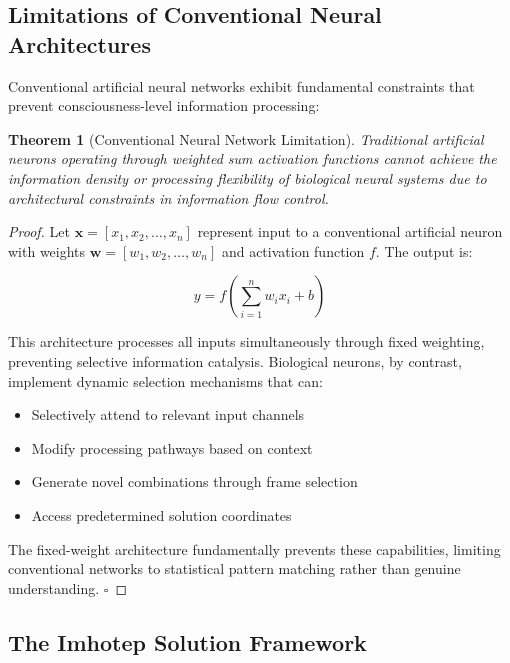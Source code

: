 \documentclass[12pt,a4paper]{article}
\newtheorem{theorem}{Theorem}[section]
\theoremstyle{remark}
\begin{document}
\subsection{Limitations of Conventional Neural Architectures}

Conventional artificial neural networks exhibit fundamental constraints that prevent consciousness-level information processing:

\begin{theorem}[Conventional Neural Network Limitation]
Traditional artificial neurons operating through weighted sum activation functions cannot achieve the information density or processing flexibility of biological neural systems due to architectural constraints in information flow control.
\end{theorem}

\begin{proof}
Let $\mathbf{x} = [x_1, x_2, \ldots, x_n]$ represent input to a conventional artificial neuron with weights $\mathbf{w} = [w_1, w_2, \ldots, w_n]$ and activation function $f$. The output is:

\begin{equation}
y = f\left(\sum_{i=1}^{n} w_i x_i + b\right)
\end{equation}

This architecture processes all inputs simultaneously through fixed weighting, preventing selective information catalysis. Biological neurons, by contrast, implement dynamic selection mechanisms that can:

\begin{itemize}
\item Selectively attend to relevant input channels
\item Modify processing pathways based on context
\item Generate novel combinations through frame selection
\item Access predetermined solution coordinates
\end{itemize}

The fixed-weight architecture fundamentally prevents these capabilities, limiting conventional networks to statistical pattern matching rather than genuine understanding. $\square$
\end{proof}

\subsection{The Imhotep Solution Framework}
\end{document}

